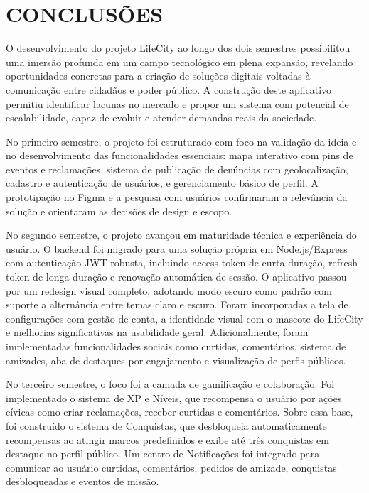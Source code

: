 
\section{CONCLUSÕES}

O desenvolvimento do projeto LifeCity ao longo dos dois semestres possibilitou
uma imersão profunda em um campo tecnológico em plena expansão, revelando
oportunidades concretas para a criação de soluções digitais voltadas à comunicação
entre cidadãos e poder público. A construção deste aplicativo permitiu identificar
lacunas no mercado e propor um sistema com potencial de escalabilidade, capaz de
evoluir e atender demandas reais da sociedade.

No primeiro semestre, o projeto foi estruturado com foco na validação da ideia e
no desenvolvimento das funcionalidades essenciais: mapa interativo com pins de
eventos e reclamações, sistema de publicação de denúncias com geolocalização,
cadastro e autenticação de usuários, e gerenciamento básico de perfil. A
prototipação no Figma e a pesquisa com usuários confirmaram a relevância da
solução e orientaram as decisões de design e escopo.

No segundo semestre, o projeto avançou em maturidade técnica e experiência do
usuário. O backend foi migrado para uma solução própria em Node.js/Express com
autenticação JWT robusta, incluindo access token de curta duração, refresh token de
longa duração e renovação automática de sessão. O aplicativo passou por um
redesign visual completo, adotando modo escuro como padrão com suporte a
alternância entre temas claro e escuro. Foram incorporadas a tela de configurações
com gestão de conta, a identidade visual com o mascote do LifeCity e melhorias
significativas na usabilidade geral. Adicionalmente, foram implementadas
funcionalidades sociais como curtidas, comentários, sistema de amizades, aba de
destaques por engajamento e visualização de perfis públicos.

No terceiro semestre, o foco foi a camada de gamificação e colaboração. Foi
implementado o sistema de XP e Níveis, que recompensa o usuário por ações cívicas
como criar reclamações, receber curtidas e comentários. Sobre essa base, foi
construído o sistema de Conquistas, que desbloqueia automaticamente recompensas
ao atingir marcos predefinidos e exibe até três conquistas em destaque no perfil
público. Um centro de Notificações foi integrado para comunicar ao usuário curtidas,
comentários, pedidos de amizade, conquistas desbloqueadas e eventos de missão.

